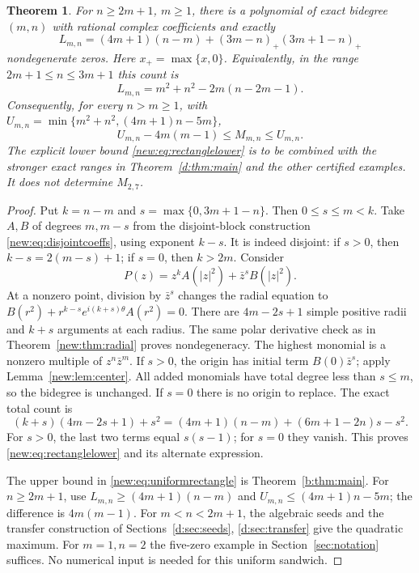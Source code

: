 \documentclass[UTF8,11pt]{ctexart}
\newtheorem{thm}{Theorem}[section]
\theoremstyle{definition}
\numberwithin{equation}{section}
\begin{document}
\begin{thm}\label{new:thm:rectangle}
For $n\ge2m+1$, $m\ge1$, there is a polynomial of exact bidegree $(m,n)$
with rational complex coefficients and exactly
\begin{equation}\label{new:eq:rectanglelower}
 L_{m,n}=(4m+1)(n-m)
       +(3m-n)_+(3m+1-n)_+
\end{equation}
nondegenerate zeros. Here $x_+=\max\{x,0\}$. Equivalently, in the range
$2m+1\le n\le3m+1$ this count is
\[
 L_{m,n}=m^2+n^2-2m(n-2m-1).
\]
Consequently, for every $n>m\ge1$, with
$U_{m,n}=\min\{m^2+n^2,(4m+1)n-5m\}$,
\begin{equation}\label{new:eq:uniformrectangle}
 U_{m,n}-4m(m-1)\le M_{m,n}\le U_{m,n}.
\end{equation}
The explicit lower bound \eqref{new:eq:rectanglelower} is to be combined
with the stronger exact ranges in Theorem~\ref{d:thm:main} and the other
certified examples. It does not determine $M_{2,7}$.
\end{thm}
\begin{proof}
Put $k=n-m$ and $s=\max\{0,3m+1-n\}$. Then $0\le s\le m<k$.
Take $A,B$ of degrees $m,m-s$ from the disjoint-block construction
\eqref{new:eq:disjointcoeffs}, using exponent $k-s$. It is indeed
disjoint: if $s>0$, then $k-s=2(m-s)+1$; if $s=0$, then $k>2m$.
Consider
\[
 P(z)=z^k A(|z|^2)+\bar z^s B(|z|^2).
\]
At a nonzero point, division by $\bar z^s$ changes the radial equation
to $B(r^2)+r^{k-s}e^{i(k+s)\theta}A(r^2)=0$.
There are $4m-2s+1$ simple positive radii and $k+s$ arguments at each
radius. The same polar derivative check as in
Theorem~\ref{new:thm:radial} proves nondegeneracy.
The highest monomial is a nonzero multiple of $z^n\bar z^m$.
If $s>0$, the origin has initial term $B(0)\bar z^s$; apply
Lemma~\ref{new:lem:center}. All added monomials have total degree less
than $s\le m$, so the bidegree is unchanged. If $s=0$ there is no
origin to replace. The exact total count is
\[
 (k+s)(4m-2s+1)+s^2
 =(4m+1)(n-m)+(6m+1-2n)s-s^2.
\]
For $s>0$, the last two terms equal $s(s-1)$; for $s=0$ they vanish.
This proves \eqref{new:eq:rectanglelower} and its alternate expression.

The upper bound in \eqref{new:eq:uniformrectangle} is
Theorem~\ref{b:thm:main}. For $n\ge2m+1$, use
$L_{m,n}\ge(4m+1)(n-m)$ and
$U_{m,n}\le(4m+1)n-5m$; the difference is $4m(m-1)$.
For $m<n<2m+1$, the algebraic seeds and the transfer construction of
Sections~\ref{d:sec:seeds}, \ref{d:sec:transfer} give the quadratic
maximum. For $m=1,n=2$ the five-zero example in
Section~\ref{sec:notation} suffices. No numerical input is needed for
this uniform sandwich.
\end{proof}
\end{document}
